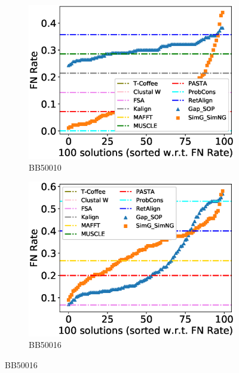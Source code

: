 \begin{figure}[!htbp]
\begin{adjustwidth}{-1.5cm}{-1cm}
		\begin{subfigure}{0.22\textwidth}
			\includegraphics[width=\columnwidth]{Figure/summary/precomputedInit/Balibase/BB50010_fnrate_density_single_run}
			\caption{BB50010}
		\end{subfigure}
		\begin{subfigure}{0.22\textwidth}
			\includegraphics[width=\columnwidth]{Figure/summary/precomputedInit/Balibase/BB50016_fnrate_density_single_run}
			\caption{BB50016}
		\end{subfigure}
		

\end{adjustwidth}
\end{figure}
